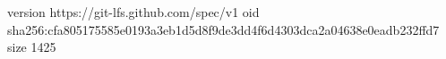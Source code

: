 version https://git-lfs.github.com/spec/v1
oid sha256:cfa805175585e0193a3eb1d5d8f9de3dd4f6d4303dca2a04638e0eadb232ffd7
size 1425
